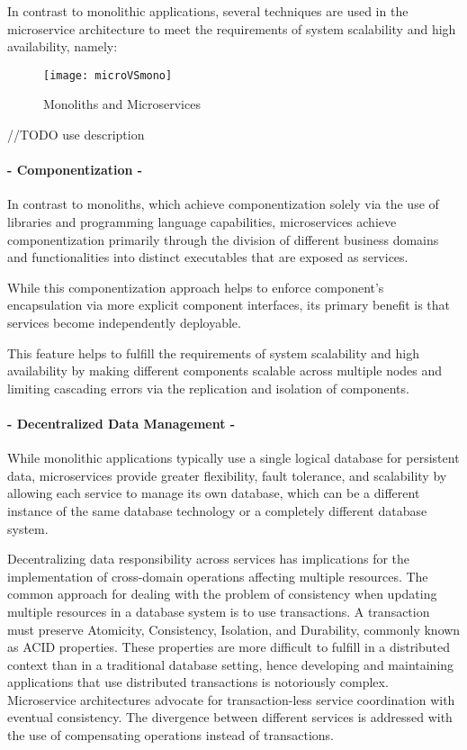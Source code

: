 In contrast to monolithic applications, several techniques are used in the microservice architecture to meet the requirements of system scalability and high availability, namely:

\begin{figure}[htbp]
    \centering
    \texttt{[image: microVSmono]}
    \caption{Monoliths and Microservices \cite{microservices}}
    \label{fig:monoliths and microservices}
\end{figure}

//TODO use description

\paragraph{- Componentization -}

In contrast to monoliths, which achieve componentization solely via the use of libraries and programming language capabilities,
microservices achieve componentization primarily through the division of different business domains and functionalities into distinct executables
that are exposed as services.

While this componentization approach helps to enforce component's encapsulation via more explicit component interfaces,
its primary benefit is that services become independently deployable.

This feature helps to fulfill the requirements of system scalability and high availability by
making different components scalable across multiple nodes and limiting cascading errors via the replication and isolation of components.

\paragraph{- Decentralized Data Management -}

While monolithic applications typically use a single logical database for persistent data, microservices provide greater flexibility, fault tolerance,
and scalability by allowing each service to manage its own database, which can be a different instance of the same database technology or a completely different database system.

Decentralizing data responsibility across services has implications for the implementation of cross-domain operations affecting multiple resources.
The common approach for dealing with the problem of consistency when updating multiple resources in a database system is to use transactions.
A transaction must preserve Atomicity, Consistency, Isolation, and Durability, commonly known as ACID properties.
These properties are more difficult to fulfill in a distributed context than in a traditional database setting, hence developing and maintaining applications that use distributed transactions is notoriously complex.
Microservice architectures advocate for transaction-less service coordination with eventual consistency.
The divergence between different services is addressed with the use of compensating operations instead of transactions.

